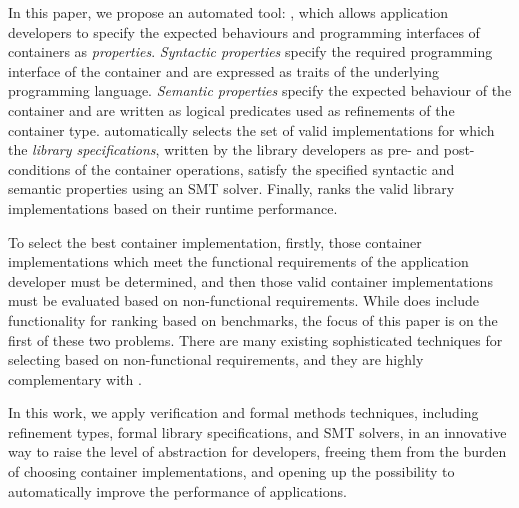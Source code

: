 In this paper, we propose an automated tool: \Primrose{}, which allows application developers to specify the expected behaviours and programming interfaces of containers as \emph{properties}.
\emph{Syntactic properties} specify the required programming interface of the container and are expressed as traits of the underlying programming language.
\emph{Semantic properties} specify the expected behaviour of the container and are written as logical predicates used as refinements of the container type.
\Primrose{} automatically selects the set of valid implementations for which the \emph{library specifications}, written by the library developers as pre- and post-conditions of the container operations, satisfy the specified syntactic and semantic properties using an SMT solver.
Finally, \Primrose{} ranks the valid library implementations based on 
their runtime performance.

To select the best container implementation, firstly, those container implementations which meet the functional requirements of the application developer must be determined, and then those valid container implementations must be evaluated based on non-functional requirements. While \Primrose{} does include functionality for ranking based on benchmarks, the focus of this paper is on the first of these two problems. There are many existing sophisticated techniques for selecting based on non-functional requirements, and they are highly complementary with \Primrose{}.

In this work, we apply verification and formal methods techniques, including refinement types, formal library specifications, and SMT solvers, in an innovative way to raise the level of abstraction for developers, freeing them from the burden of choosing container implementations, and opening up the possibility to automatically improve the performance of applications.

